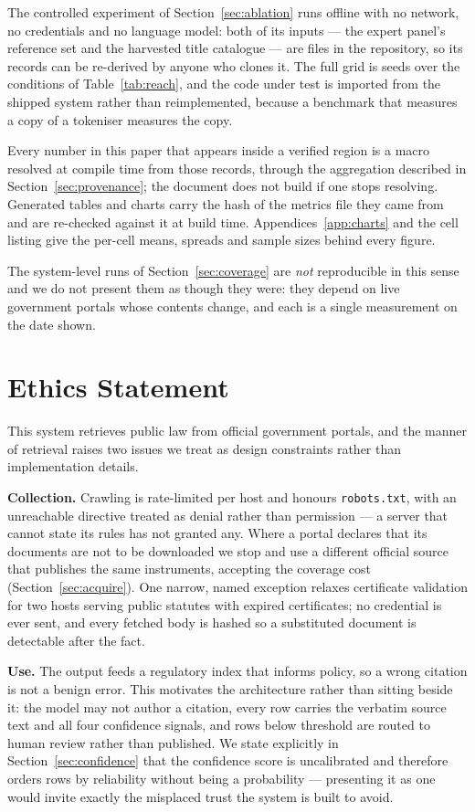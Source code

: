 \documentclass{article}
\begin{document}
The controlled experiment of Section~\ref{sec:ablation} runs offline with no
network, no credentials and no language model: both of its inputs --- the expert
panel's reference set and the harvested title catalogue --- are files in the
repository, so its records can be re-derived by anyone who clones it. The full
grid is  seeds over the conditions of
Table~\ref{tab:reach}, and the code under test is imported from the shipped
system rather than reimplemented, because a benchmark that measures a copy of a
tokeniser measures the copy.

Every number in this paper that appears inside a verified region is a macro
resolved at compile time from those records, through the aggregation described in
Section~\ref{sec:provenance}; the document does not build if one stops resolving.
Generated tables and charts carry the hash of the metrics file they came from and
are re-checked against it at build time. Appendices~\ref{app:charts} and the
cell listing give the per-cell means, spreads and sample sizes behind every
figure.

The system-level runs of Section~\ref{sec:coverage} are \emph{not} reproducible
in this sense and we do not present them as though they were: they depend on
live government portals whose contents change, and each is a single measurement
on the date shown.

\section*{Ethics Statement}

This system retrieves public law from official government portals, and the manner
of retrieval raises two issues we treat as design constraints rather than
implementation details.

\textbf{Collection.} Crawling is rate-limited per host and honours
\texttt{robots.txt}, with an unreachable directive treated as denial rather than
permission --- a server that cannot state its rules has not granted any. Where a
portal declares that its documents are not to be downloaded we stop and use a
different official source that publishes the same instruments, accepting the
coverage cost (Section~\ref{sec:acquire}). One narrow, named exception relaxes
certificate validation for two hosts serving public statutes with expired
certificates; no credential is ever sent, and every fetched body is hashed so a
substituted document is detectable after the fact.

\textbf{Use.} The output feeds a regulatory index that informs policy, so a wrong
citation is not a benign error. This motivates the architecture rather than
sitting beside it: the model may not author a citation, every row carries the
verbatim source text and all four confidence signals, and rows below threshold
are routed to human review rather than published. We state explicitly in
Section~\ref{sec:confidence} that the confidence score is uncalibrated and
therefore orders rows by reliability without being a probability --- presenting
it as one would invite exactly the misplaced trust the system is built to avoid.
\end{document}
